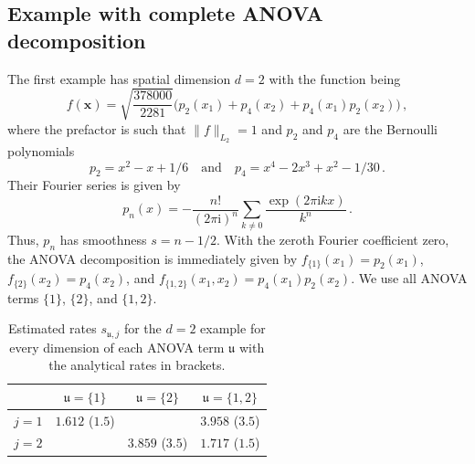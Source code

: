 \documentclass[a4paper]{scrartcl}
\numberwithin{equation}{section}
\begin{document}
\subsection{Example with complete ANOVA decomposition} 

The first example has spatial dimension $d=2$ with the function being
\begin{equation}\label{eq:2}
    f(\bm x) = \sqrt{\frac{378000}{2281}} \Big(p_2(x_1) + p_4(x_2) + p_4(x_1)p_2(x_2)\Big) \,,
\end{equation}
where the prefactor is such that $\|f\|_{L_2} = 1$ and $p_2$ and $p_4$ are the Bernoulli polynomials
\begin{equation*}
    p_2 = x^2-x+1/6
    \quad\text{and}\quad
    p_4 = x^4-2x^3+x^2-1/30 \,.
\end{equation*}
Their Fourier series is given by
\begin{equation*}
    p_n(x) = -\frac{n!}{(2\pi\mathrm i)^n}\sum_{k\neq 0} \frac{\exp(2\pi\mathrm i kx)}{k^n} \,.
\end{equation*}
Thus, $p_n$ has smoothness $s = n-1/2$.
With the zeroth Fourier coefficient zero, the ANOVA decomposition is immediately given by $f_{\{1\}}(x_1) = p_2(x_1)$, $f_{\{2\}}(x_2) = p_4(x_2)$, and $f_{\{1,2\}}(x_1,x_2) = p_4(x_1)p_2(x_2)$.
We use all ANOVA terms $\{1\}$, $\{2\}$, and $\{1,2\}$.

\begin{table}
    \centering
    \begin{tabular}{c|ccc}
        & $\mathfrak u = \{1\}$ & $\mathfrak u = \{2\}$ & $\mathfrak u = \{1,2\}$ \\
        \hline
        $j=1$ & $1.612$ ($1.5$) & & $3.958$ ($3.5$) \\
        $j=2$ & & $3.859$ ($3.5$) & $1.717$ ($1.5$)
    \end{tabular}
    \caption{Estimated rates $s_{\mathfrak u,j}$ for the $d=2$ example for every dimension of each ANOVA term $\mathfrak u$ with the analytical rates in brackets.}\label{s2_rates}
\end{table}
\end{document}
